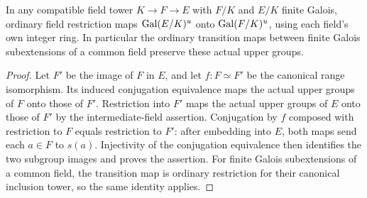 \begin{lemma}
\label{fw:finite-tower-upper-restriction}
\leanok
In any compatible field tower $K\to F\to E$ with $F/K$ and $E/K$
finite Galois, ordinary field restriction maps $\operatorname{Gal}(E/K)^u$ onto
$\operatorname{Gal}(F/K)^u$, using each field's own integer ring.
In particular the ordinary transition maps between finite Galois
subextensions of a common field preserve these actual upper groups.
\end{lemma}
\begin{proof}
Let $F'$ be the image of $F$ in $E$, and let $f:F\simeq F'$ be the
canonical range isomorphism. Its induced conjugation equivalence maps
the actual upper groups of $F$ onto those of $F'$. Restriction into
$F'$ maps the actual upper groups of $E$ onto those of $F'$ by the
intermediate-field assertion. Conjugation by $f$ composed with restriction
to $F$ equals restriction to $F'$: after embedding into $E$, both maps
send each $a\in F$ to $s(a)$. Injectivity of the conjugation equivalence
then identifies the two subgroup images and proves the assertion.
For finite Galois subextensions of a common field, the transition map is
ordinary restriction for their canonical inclusion tower, so the same
identity applies.
\end{proof}

